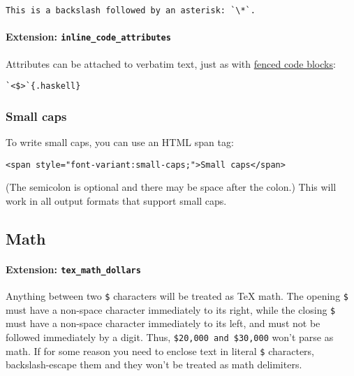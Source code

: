 \documentclass[]{article}
\let\oldparagraph\paragraph
\renewcommand{\paragraph}[1]{\oldparagraph{#1}\mbox{}}
\begin{document}
\begin{verbatim}
This is a backslash followed by an asterisk: `\*`.
\end{verbatim}

\paragraph{\texorpdfstring{Extension:
\texttt{inline\_code\_attributes}}{Extension: inline\_code\_attributes}}\label{extension-inline_code_attributes}

Attributes can be attached to verbatim text, just as with
\protect\hyperlink{fenced-code-blocks}{fenced code blocks}:

\begin{verbatim}
`<$>`{.haskell}
\end{verbatim}

\subsubsection{Small caps}\label{small-caps}

To write small caps, you can use an HTML span tag:

\begin{verbatim}
<span style="font-variant:small-caps;">Small caps</span>
\end{verbatim}

(The semicolon is optional and there may be space after the colon.) This
will work in all output formats that support small caps.

\hypertarget{math}{\subsection{Math}\label{math}}

\paragraph{\texorpdfstring{Extension:
\texttt{tex\_math\_dollars}}{Extension: tex\_math\_dollars}}\label{extension-tex_math_dollars}

Anything between two \texttt{\$} characters will be treated as TeX math.
The opening \texttt{\$} must have a non-space character immediately to
its right, while the closing \texttt{\$} must have a non-space character
immediately to its left, and must not be followed immediately by a
digit. Thus, \texttt{\$20,000\ and\ \$30,000} won't parse as math. If
for some reason you need to enclose text in literal \texttt{\$}
characters, backslash-escape them and they won't be treated as math
delimiters.
\end{document}
